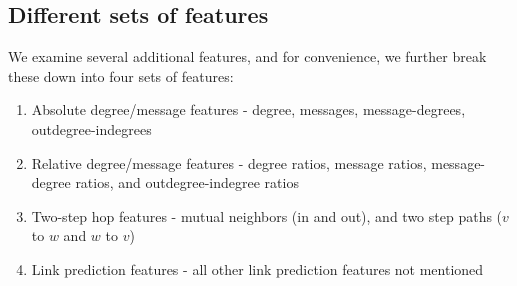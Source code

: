 \documentclass[conference]{IEEEtran}
\begin{document}
\subsection{Different sets of features}
We examine several additional features, and for convenience, we further break these down into four sets of features:
\begin{enumerate}
	\item Absolute degree/message features - degree, messages, message-degrees, outdegree-indegrees
	\item Relative degree/message features - degree ratios, message ratios, message-degree ratios, and outdegree-indegree ratios
	\item Two-step hop features - mutual neighbors (in and out), and two step paths ($v$ to $w$ and $w$ to $v$)
	\item Link prediction features - all other link prediction features not mentioned
\end{enumerate}
\end{document}
